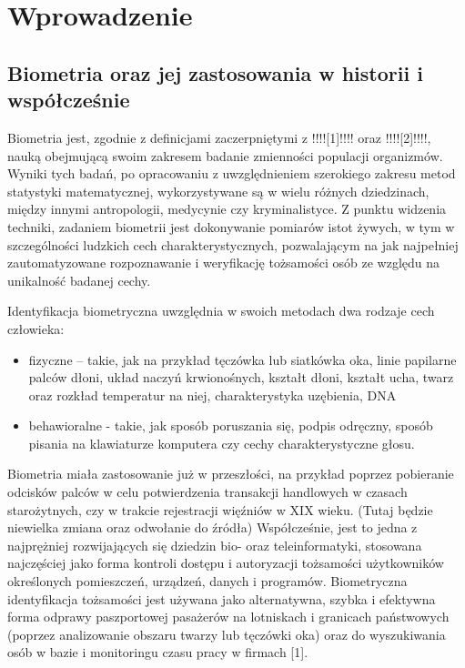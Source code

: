 \chapter{Wprowadzenie}
\label{cha:wprowadzenie}


\section{Biometria oraz jej zastosowania w historii i współcześnie}
\label{sec:biometria}

Biometria jest, zgodnie z definicjami zaczerpniętymi z !!!![1]!!!! oraz !!!![2]!!!!, nauką obejmującą swoim zakresem badanie zmienności populacji organizmów. Wyniki tych badań, po opracowaniu z uwzględnieniem szerokiego zakresu metod statystyki matematycznej, wykorzystywane są w wielu różnych dziedzinach, między innymi antropologii, medycynie czy kryminalistyce. Z punktu widzenia techniki, zadaniem biometrii jest dokonywanie pomiarów istot żywych, w tym w szczególności ludzkich cech charakterystycznych, pozwalającym na jak najpełniej zautomatyzowane rozpoznawanie i weryfikację tożsamości osób ze względu na unikalność badanej cechy.

Identyfikacja biometryczna uwzględnia w swoich metodach dwa rodzaje cech człowieka:
\begin{itemize} 
\item fizyczne – takie, jak na przykład tęczówka lub siatkówka oka, linie papilarne palców dłoni, układ naczyń krwionośnych, kształt dłoni, kształt ucha, twarz oraz rozkład temperatur na niej, charakterystyka uzębienia, DNA 
\item behawioralne - takie, jak sposób poruszania się, podpis odręczny, sposób pisania na klawiaturze komputera czy cechy charakterystyczne głosu.
\end{itemize}

Biometria miała zastosowanie już w przeszłości, na przykład poprzez pobieranie odcisków palców w celu potwierdzenia transakcji handlowych w czasach starożytnych, czy w trakcie rejestracji więźniów w XIX wieku. (Tutaj będzie niewielka zmiana oraz odwołanie do źródła) Współcześnie, jest to jedna z najprężniej rozwijających się dziedzin bio- oraz teleinformatyki, stosowana najczęściej jako forma kontroli dostępu i autoryzacji tożsamości użytkowników określonych pomieszczeń, urządzeń, danych i programów. Biometryczna identyfikacja tożsamości jest używana jako alternatywna, szybka i efektywna forma odprawy paszportowej pasażerów na lotniskach i granicach państwowych (poprzez analizowanie obszaru twarzy lub tęczówki oka) oraz do wyszukiwania osób w bazie i monitoringu czasu pracy w firmach [1].

